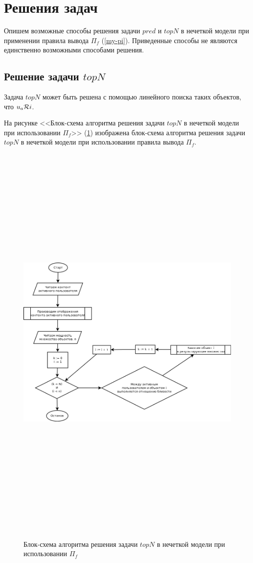 \section{Решения задач}
Опишем возможные способы решения задачи $pred$
и $topN$ в нечеткой модели при применении правила вывода
$\Pi_f$ (\ref{my-pi}).
Приведенные способы не являются единственно возможными способами решения.

\subsection{Решение задачи $topN$}
Задача $topN$ может быть решена с помощью линейного поиска
таких объектов, что $u_a \mathcal{R} i$.


На рисунке <<Блок-схема алгоритма решения задачи $topN$ в нечеткой модели при
	использовании $\Pi_f$>> (\ref{dia:fuz-topn}) изображена блок-схема алгоритма
решения задачи $topN$ в нечеткой модели при использовании
правила вывода $\Pi_f$.
\begin{figure}[hbtp]
	\caption{Блок-схема алгоритма решения задачи $topN$ в нечеткой модели при
	использовании $\Pi_f$}
\begin{center}
	\label{dia:fuz-topn}
 \includegraphics[width=7in,height=8in]{pics/algs/fuz-topn.png}
\end{center}
\end{figure}
